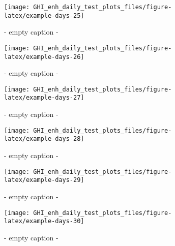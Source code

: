 \documentclass[
  10pt,
  a4paper,oneside]{article}
\begin{document}
\begin{figure}[H]

{\centering \texttt{[image: GHI\_enh\_daily\_test\_plots\_files/figure-latex/example-days-25]} 

}

\caption{ - empty caption - }\label{fig:example-days-25}
\end{figure}

\begin{figure}[H]

{\centering \texttt{[image: GHI\_enh\_daily\_test\_plots\_files/figure-latex/example-days-26]} 

}

\caption{ - empty caption - }\label{fig:example-days-26}
\end{figure}

\begin{figure}[H]

{\centering \texttt{[image: GHI\_enh\_daily\_test\_plots\_files/figure-latex/example-days-27]} 

}

\caption{ - empty caption - }\label{fig:example-days-27}
\end{figure}

\begin{figure}[H]

{\centering \texttt{[image: GHI\_enh\_daily\_test\_plots\_files/figure-latex/example-days-28]} 

}

\caption{ - empty caption - }\label{fig:example-days-28}
\end{figure}

\begin{figure}[H]

{\centering \texttt{[image: GHI\_enh\_daily\_test\_plots\_files/figure-latex/example-days-29]} 

}

\caption{ - empty caption - }\label{fig:example-days-29}
\end{figure}

\begin{figure}[H]

{\centering \texttt{[image: GHI\_enh\_daily\_test\_plots\_files/figure-latex/example-days-30]} 

}

\caption{ - empty caption - }\label{fig:example-days-30}
\end{figure}
\end{document}
